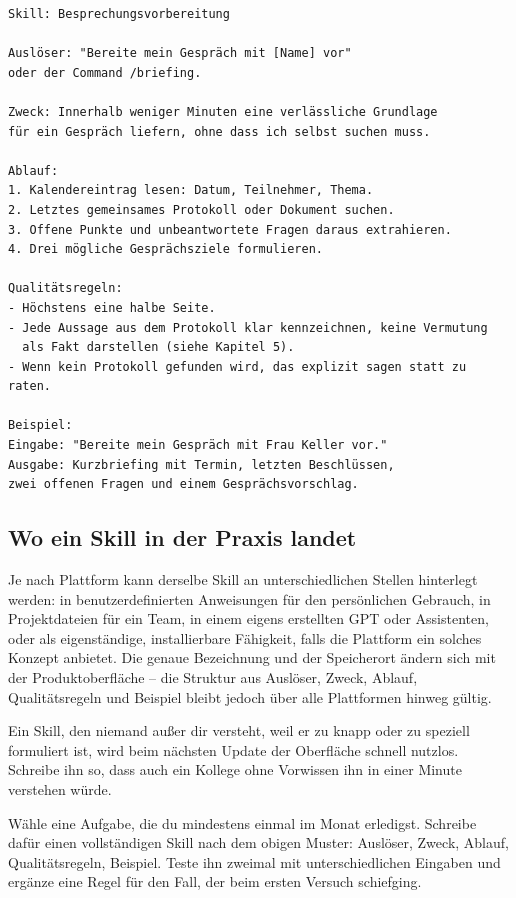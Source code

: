 \begin{lstlisting}
Skill: Besprechungsvorbereitung

Auslöser: "Bereite mein Gespräch mit [Name] vor"
oder der Command /briefing.

Zweck: Innerhalb weniger Minuten eine verlässliche Grundlage
für ein Gespräch liefern, ohne dass ich selbst suchen muss.

Ablauf:
1. Kalendereintrag lesen: Datum, Teilnehmer, Thema.
2. Letztes gemeinsames Protokoll oder Dokument suchen.
3. Offene Punkte und unbeantwortete Fragen daraus extrahieren.
4. Drei mögliche Gesprächsziele formulieren.

Qualitätsregeln:
- Höchstens eine halbe Seite.
- Jede Aussage aus dem Protokoll klar kennzeichnen, keine Vermutung
  als Fakt darstellen (siehe Kapitel 5).
- Wenn kein Protokoll gefunden wird, das explizit sagen statt zu raten.

Beispiel:
Eingabe: "Bereite mein Gespräch mit Frau Keller vor."
Ausgabe: Kurzbriefing mit Termin, letzten Beschlüssen,
zwei offenen Fragen und einem Gesprächsvorschlag.
\end{lstlisting}

\subsection{Wo ein Skill in der Praxis landet}

Je nach Plattform kann derselbe Skill an unterschiedlichen Stellen hinterlegt werden: in benutzerdefinierten Anweisungen für den persönlichen Gebrauch, in Projektdateien für ein Team, in einem eigens erstellten GPT oder Assistenten, oder als eigenständige, installierbare Fähigkeit, falls die Plattform ein solches Konzept anbietet. Die genaue Bezeichnung und der Speicherort ändern sich mit der Produktoberfläche -- die Struktur aus Auslöser, Zweck, Ablauf, Qualitätsregeln und Beispiel bleibt jedoch über alle Plattformen hinweg gültig.

\begin{achtung}
Ein Skill, den niemand außer dir versteht, weil er zu knapp oder zu speziell formuliert ist, wird beim nächsten Update der Oberfläche schnell nutzlos. Schreibe ihn so, dass auch ein Kollege ohne Vorwissen ihn in einer Minute verstehen würde.
\end{achtung}

\begin{praxis}
Wähle eine Aufgabe, die du mindestens einmal im Monat erledigst. Schreibe dafür einen vollständigen Skill nach dem obigen Muster: Auslöser, Zweck, Ablauf, Qualitätsregeln, Beispiel. Teste ihn zweimal mit unterschiedlichen Eingaben und ergänze eine Regel für den Fall, der beim ersten Versuch schiefging.
\end{praxis}

